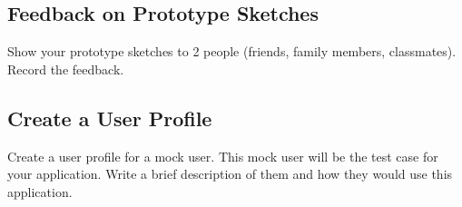 \documentclass{article}
\begin{document}
\subsection{Feedback on Prototype Sketches}
Show your prototype sketches to 2 people (friends, family members, classmates). Record the feedback.

\subsection{Create a User Profile}
Create a user profile for a mock user. This mock user will be the test case for your application. Write a brief description of them and how they would use this application.
\end{document}
